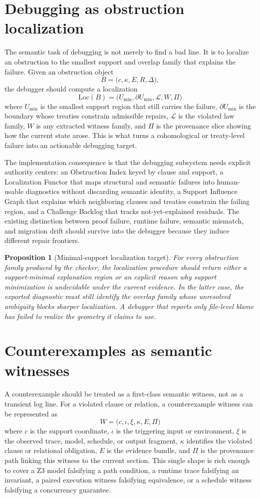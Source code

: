 \documentclass[11pt]{report}
\newtheorem{proposition}[definition]{Proposition}
\begin{document}
\section{Debugging as obstruction localization}
The semantic task of debugging is not merely to find a bad line. It is to localize an obstruction to the smallest support and overlap family that explains the failure. Given an obstruction object
\[
B=\bigl(c,\kappa,E,R,\Delta\bigr),
\]
the debugger should compute a localization
\[
\mathrm{Loc}(B)=\bigl(U_{\min},\partial U_{\min},\mathcal{L},W,\Pi\bigr)
\]
where $U_{\min}$ is the smallest support region that still carries the failure, $\partial U_{\min}$ is the boundary whose treaties constrain admissible repairs, $\mathcal{L}$ is the violated law family, $W$ is any extracted witness family, and $\Pi$ is the provenance slice showing how the current state arose. This is what turns a cohomological or treaty-level failure into an actionable debugging target.

The implementation consequence is that the debugging subsystem needs explicit authority centers: an Obstruction Index keyed by clause and support, a Localization Functor that maps structural and semantic failures into human-usable diagnostics without discarding semantic identity, a Support Influence Graph that explains which neighboring clauses and treaties constrain the failing region, and a Challenge Backlog that tracks not-yet-explained residuals. The existing distinction between proof failure, runtime failure, semantic mismatch, and migration drift should survive into the debugger because they induce different repair frontiers.

\begin{proposition}[Minimal-support localization target]
For every obstruction family produced by the checker, the localization procedure should return either a support-minimal explanation region or an explicit reason why support minimization is undecidable under the current evidence. In the latter case, the exported diagnostic must still identify the overlap family whose unresolved ambiguity blocks sharper localization. A debugger that reports only file-level blame has failed to realize the geometry it claims to use.
\end{proposition}
\section{Counterexamples as semantic witnesses}
 A counterexample should be treated as a first-class semantic witness, not as a transient log line. For a violated clause or relation, a counterexample witness can be represented as
\[
W=\bigl(c,\iota,\xi,\kappa,E,\Pi\bigr)
\]
where $c$ is the support coordinate, $\iota$ is the triggering input or environment, $\xi$ is the observed trace, model, schedule, or output fragment, $\kappa$ identifies the violated clause or relational obligation, $E$ is the evidence bundle, and $\Pi$ is the provenance path linking this witness to the current section. This single shape is rich enough to cover a Z3 model falsifying a path condition, a runtime trace falsifying an invariant, a paired execution witness falsifying equivalence, or a schedule witness falsifying a concurrency guarantee.
\end{document}
